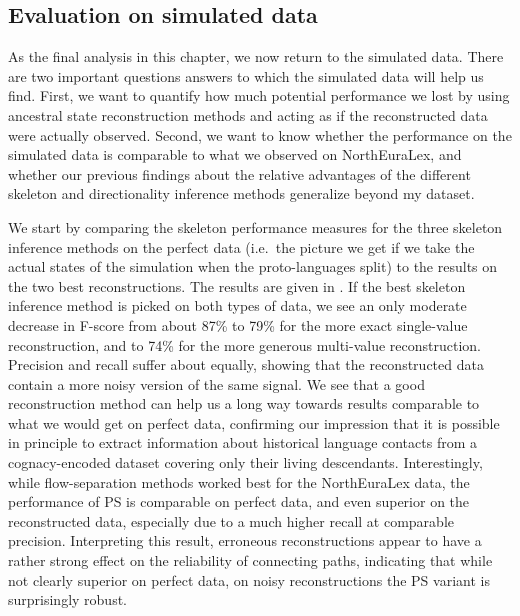\subsection{Evaluation on simulated data}
As the final analysis in this chapter, we now return to the simulated data. There are two important questions answers to which the simulated data will help us find. First, we want to quantify how much potential performance we lost by using ancestral state reconstruction methods and acting as if the reconstructed data were actually observed. Second, we want to know whether the performance on the simulated data is comparable to what we observed on NorthEuraLex, and whether our previous findings about the relative advantages of the different skeleton and directionality inference methods generalize beyond my dataset.

We start by comparing the skeleton performance measures for the three skeleton inference methods on the perfect data (i.e.\ the picture we get if we take the actual states of the simulation when the proto-languages split) to the results on the two best reconstructions. The results are given in . If the best skeleton inference method is picked on both types of data, we see an only moderate decrease in F-score from about 87\% to 79\% for the more exact single-value reconstruction, and to 74\% for the more generous multi-value reconstruction. Precision and recall suffer about equally, showing that the reconstructed data contain a more noisy version of the same signal. We see that a good reconstruction method can help us a long way towards results comparable to what we would get on perfect data, confirming our impression that it is possible in principle to extract information about historical language contacts from a cognacy-encoded dataset covering only their living 
descendants. Interestingly, while flow-separation methods worked best for the NorthEuraLex data, the performance of PS is comparable on perfect data, and even superior on the reconstructed data, especially due to a much higher recall at comparable precision. Interpreting this result, erroneous reconstructions appear to have a rather strong effect on the reliability of connecting paths, indicating that while not clearly superior on perfect data, on noisy reconstructions the PS variant is surprisingly robust.

